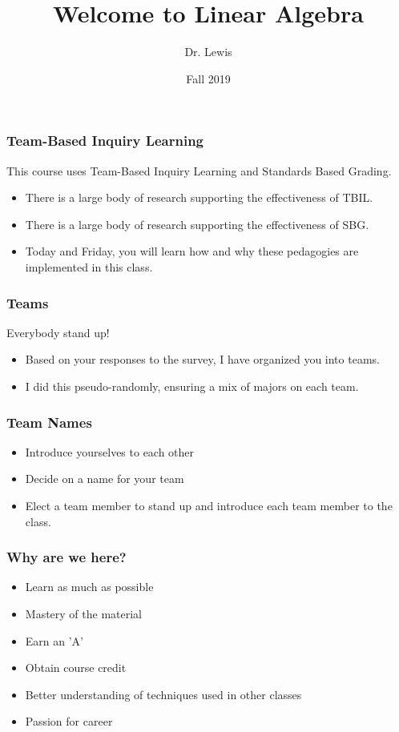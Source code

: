 \documentclass[aspectration=1610]{beamer}
\title{Welcome to Linear Algebra}
\author{Dr. Lewis}
\date{Fall 2019}
\begin{document}
\begin{frame}
\titlepage
\end{frame}

\begin{frame}\frametitle{Team-Based Inquiry Learning}
This course uses Team-Based Inquiry Learning and Standards Based Grading.
\begin{itemize}
	\item There is a large body of research supporting the effectiveness of TBIL.
	\item There is a large body of research supporting the effectiveness of SBG.
	\item Today and Friday, you will learn how and why these pedagogies are implemented in this class.
\end{itemize}
  
\end{frame}
 
\begin{frame}\frametitle{Teams}
Everybody stand up!
  
\begin{itemize}
\item Based on your responses to the survey, I have organized you into teams.
\item I did this pseudo-randomly, ensuring a mix of majors on each team.
\end{itemize}
\end{frame}

\begin{frame}\frametitle{Team Names}
\begin{itemize}
\item Introduce yourselves to each other
\item Decide on a name for your team
\item Elect a team member to stand up and introduce each team member to the class.
\end{itemize}
\end{frame}

\begin{frame} \frametitle{Why are we here?}
\begin{itemize}
\item Learn as much as possible
\item Mastery of the material
\item Earn an 'A'
\item Obtain course credit
\item Better understanding of techniques used in other classes
\item Passion for career
\end{itemize}


\end{frame}
\end{document}
